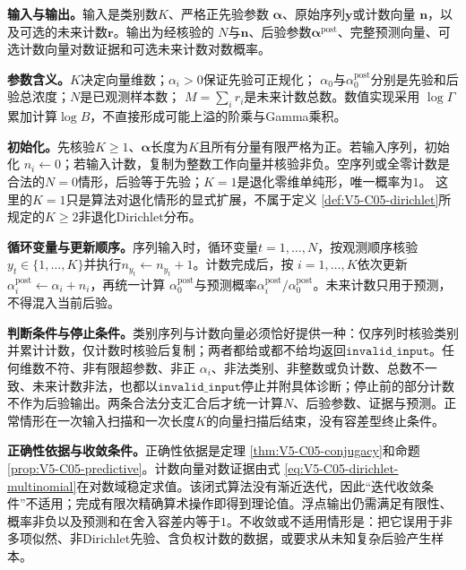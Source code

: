 \label{struct:V5-C05-CH20}
\textbf{输入与输出。}输入是类别数$K$、严格正先验参数
$\boldsymbol\alpha$、原始序列$\boldsymbol y$或计数向量
$\boldsymbol n$，以及可选的未来计数$\boldsymbol r$。输出为经核验的
$N$与$\boldsymbol n$、后验参数$\boldsymbol\alpha^{\mathrm{post}}$、完整预测向量、可选计数向量对数证据和可选未来计数对数概率。

\label{struct:V5-C05-CH21}
\textbf{参数含义。}$K$决定向量维数；$\alpha_i>0$保证先验可正规化；
$\alpha_0$与$\alpha_0^{\mathrm{post}}$分别是先验和后验总浓度；$N$是已观测样本数；
$M=\sum_i r_i$是未来计数总数。数值实现采用
$\log\Gamma$累加计算$\log B$，不直接形成可能上溢的阶乘与Gamma乘积。

\label{struct:V5-C05-CH22}
\textbf{初始化。}先核验$K\ge1$、$\boldsymbol\alpha$长度为$K$且所有分量有限严格为正。若输入序列，初始化
$n_i\leftarrow0$；若输入计数，复制为整数工作向量并核验非负。空序列或全零计数是合法的$N=0$情形，后验等于先验；$K=1$是退化零维单纯形，唯一概率为$1$。
这里的$K=1$只是算法对退化情形的显式扩展，不属于定义
\ref{def:V5-C05-dirichlet}所规定的$K\ge2$非退化Dirichlet分布。

\label{struct:V5-C05-CH23}
\textbf{循环变量与更新顺序。}序列输入时，循环变量$t=1,\ldots,N$，按观测顺序核验
$y_t\in\{1,\ldots,K\}$并执行$n_{y_t}\leftarrow n_{y_t}+1$。计数完成后，按
$i=1,\ldots,K$依次更新$\alpha_i^{\mathrm{post}}\leftarrow\alpha_i+n_i$，再统一计算
$\alpha_0^{\mathrm{post}}$与预测概率$\alpha_i^{\mathrm{post}}/\alpha_0^{\mathrm{post}}$。未来计数只用于预测，不得混入当前后验。

\label{struct:V5-C05-CH24}
\textbf{判断条件与停止条件。}类别序列与计数向量必须恰好提供一种：仅序列时核验类别并累计计数，仅计数时核验后复制；两者都给或都不给均返回$\mathtt{invalid\_input}$。任何维数不符、非有限超参数、非正
$\alpha_i$、非法类别、非整数或负计数、总数不一致、未来计数非法，也都以$\mathtt{invalid\_input}$停止并附具体诊断；停止前的部分计数不作为后验输出。两条合法分支汇合后才统一计算$N$、后验参数、证据与预测。正常情形在一次输入扫描和一次长度$K$的向量扫描后结束，没有容差型终止条件。

\label{struct:V5-C05-CH25}
\textbf{正确性依据与收敛条件。}正确性依据是定理
\ref{thm:V5-C05-conjugacy}和命题\ref{prop:V5-C05-predictive}。计数向量对数证据由式
\eqref{eq:V5-C05-dirichlet-multinomial}在对数域稳定求值。该闭式算法没有渐近迭代，因此“迭代收敛条件”不适用；完成有限次精确算术操作即得到理论值。浮点输出仍需满足有限性、概率非负以及预测和在舍入容差内等于$1$。不收敛或不适用情形是：把它误用于非多项似然、非Dirichlet先验、含负权计数的数据，或要求从未知复杂后验产生样本。

